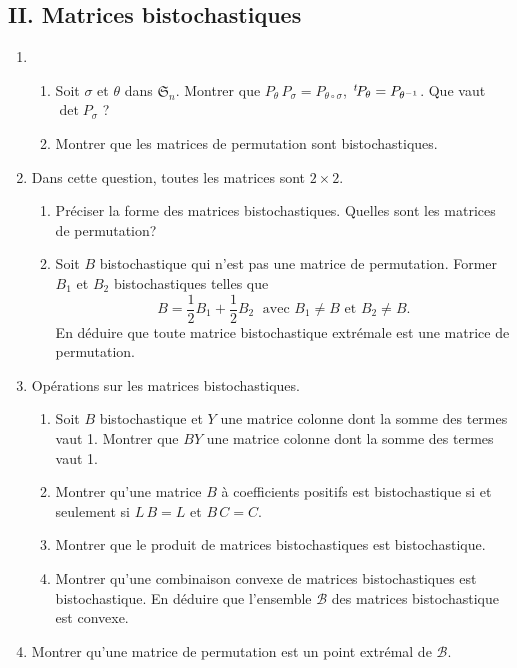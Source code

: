 \subsection*{II. Matrices bistochastiques}
\begin{enumerate}
 \item 
 \begin{enumerate}
  \item Soit $\sigma$ et $\theta$ dans $\mathfrak{S}_n$. Montrer que $P_\theta\, P_\sigma = P_{\theta \circ \sigma}$, $\,\mathstrut^t\! P_{\theta} = P_{\theta^{-1}}$. Que vaut $\det P_\sigma$ ?
  \item Montrer que les matrices de permutation sont bistochastiques. 
 \end{enumerate}
 \item Dans cette question, toutes les matrices sont $2 \times 2$.
 \begin{enumerate}
  \item Préciser la forme des matrices bistochastiques. Quelles sont les matrices de permutation?
  \item Soit $B$ bistochastique qui n'est pas une matrice de permutation. Former $B_1$ et $B_2$ bistochastiques telles que 
\[
 B = \frac{1}{2}B_1 + \frac{1}{2}B_2 \; \text{ avec } B_1 \neq B \text{ et } B_2 \neq B.
\]
En déduire que toute matrice bistochastique extrémale est une matrice de permutation.
 \end{enumerate}

 \item Opérations sur les matrices bistochastiques.
 \begin{enumerate}
  \item Soit $B$ bistochastique et $Y$ une matrice colonne dont la somme des termes vaut 1. Montrer que $B Y$ une matrice colonne dont la somme des termes vaut 1.
  \item Montrer qu'une matrice $B$ à coefficients positifs est bistochastique si et seulement si $L\,B = L$ et $B\, C = C$.
  \item Montrer que le produit de matrices bistochastiques est bistochastique.
  \item Montrer qu'une combinaison convexe de matrices bistochastiques est bistochastique. En déduire que l'ensemble $\mathcal{B}$ des matrices bistochastique est convexe.
 \end{enumerate}
 
 \item Montrer qu'une matrice de permutation est un point extrémal de $\mathcal{B}$.
 

\end{enumerate}
